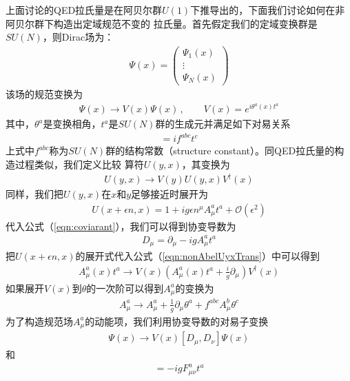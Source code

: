 上面讨论的QED拉氏量是在阿贝尔群$U(1)$下推导出的，下面我们讨论如何在非阿贝尔群下构造出定域规范不变的
拉氏量。首先假定我们的定域变换群是$SU(N)$，则Dirac场为：
\begin{eqnarray}
\Psi(x) = \left(\begin{array}{c} \Psi_1(x) \\ \vdots \\ \Psi_N(x) \end{array}\right)
\end{eqnarray}
该场的规范变换为
\begin{eqnarray}
\Psi(x) \to V(x) \Psi(x)\,, \qquad V(x) = e^{i\theta^a(x)t^a}
\end{eqnarray}
其中，$\theta^a$是变换相角，$t^a$是$SU(N)$群的生成元并满足如下对易关系
\begin{eqnarray}
[t^a, t^b] = i f^{abc} t^c
\end{eqnarray}
上式中$f^{abc}$称为$SU(N)$群的结构常数（structure constant）。同QED拉氏量的构造过程类似，我们定义比较
算符$U(y,x)$，其变换为
\begin{eqnarray}
U(y,x) \to V(y) U(y,x) V^{\dagger}(x)
\label{eqn:nonAbelUyxTrans}
\end{eqnarray}
同样，我们把$U(y,x)$在$x$和$y$足够接近时展开为
\begin{eqnarray}
U(x+\epsilon n, x) = 1 + ig\epsilon n^{\mu}A^a_{\mu} t^a + \mathcal{O}(\epsilon^2)
\end{eqnarray}
代入公式（\ref{eqn:coviarant}），我们可以得到协变导数为
\begin{eqnarray}
D_{\mu} = \partial_{\mu} - ig A^a_{\mu} t^a
\end{eqnarray}
把$U(x+\epsilon n,x)$的展开式代入公式（\ref{eqn:nonAbelUyxTrans}）中可以得到
\begin{eqnarray}
A^a_{\mu}(x) t^a \to V(x)\left(A^a_{\mu}(x) t^a + \frac{i}{g} \partial_{\mu}\right)V^{\dagger}(x)
\end{eqnarray}
如果展开$V(x)$到$\theta$的一次阶可以得到$A^a_{\mu}$的变换为
\begin{eqnarray}
A^a_{\mu} \to A^a_{\mu} + \frac{1}{g}\partial_{\mu}\theta^a + f^{abc} A^b_{\mu} \theta^c
\end{eqnarray}
为了构造规范场$A^a_{\mu}$的动能项，我们利用协变导数的对易子变换
\begin{eqnarray}
[D_{\mu}, D_{\nu}] \Psi(x) \to V(x)[D_{\mu}, D_{\nu}]\Psi(x)
\end{eqnarray}
和
\begin{eqnarray}
[D_{\mu}, D_{\nu}] = -ig F^a_{\mu\nu} t^a 
\end{eqnarray}
